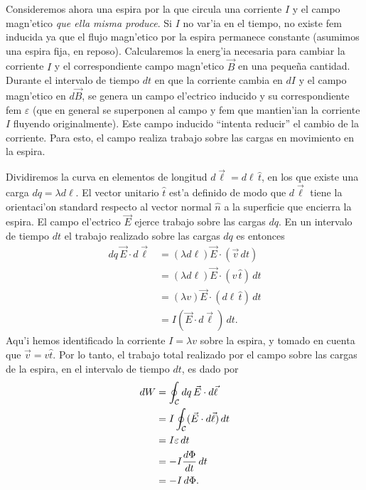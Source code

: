 Consideremos ahora una espira por la que circula una corriente $I$ y el campo magn'etico \textit{que ella misma produce}. Si $I$ no var'ia en el tiempo, no existe fem inducida ya que el flujo magn'etico por la espira permanece constante (asumimos una espira fija, en reposo). Calcularemos la energ'ia necesaria para cambiar la corriente $I$ y el correspondiente campo magn'etico $\vec{B}$ en una peque\~na cantidad. Durante el intervalo de tiempo $dt$ en que la corriente cambia en $dI$ y el campo magn'etico en $d\vec{B}$, se genera un campo el'ectrico inducido y su correspondiente fem $\varepsilon$ (que en general se superponen al campo y fem que mantien'ian la corriente $I$ fluyendo originalmente). Este campo inducido ``intenta reducir'' el cambio de la corriente. Para esto, el campo realiza trabajo sobre las cargas en movimiento en la espira. 

Dividiremos la curva en elementos de longitud $d\vec{\ell}=d\ell \,\hat{t}$, en los que existe una carga $dq=\lambda d\ell$. El vector unitario $\hat{t}$ est'a definido de modo que $d\vec{\ell}$ tiene la orientaci'on standard respecto al vector normal $\hat{n}$ a la superficie que encierra la espira. El campo el'ectrico $\vec{E}$ ejerce trabajo sobre las cargas $dq$. En un intervalo de tiempo $dt$ el trabajo realizado sobre las cargas $dq$ es entonces 
\begin{align}
dq\,\vec{E}\cdot d\vec{\ell} &= (\lambda d\ell) \vec{E}\cdot (\vec{v}\,dt) \\
&= (\lambda d\ell) \vec{E}\cdot (v\,\hat{t})\,dt \\
&= (\lambda v) \vec{E}\cdot (d\ell\,\hat{t})\,dt \\
&= I(\vec{E}\cdot d\vec{\ell})\,dt.
\end{align}
Aqu'i hemos identificado la corriente $I=\lambda v$ sobre la espira, y tomado en cuenta que $\vec{v}=v\hat{t}$. Por lo tanto, el trabajo total realizado por el campo sobre las cargas de la espira, en el intervalo de tiempo $dt$, es dado por
\begin{align}
dW &= \oint_{\cal C}dq\,\vec{E}\cdot d\vec{\ell} \\
&= I\oint_{\cal C}(\vec{E}\cdot d\vec{\ell})\,dt \\
&= I\varepsilon\,dt \\
&= -I\frac{d\Phi}{dt}\,dt \\
&= -I\,d\Phi.
\end{align}

